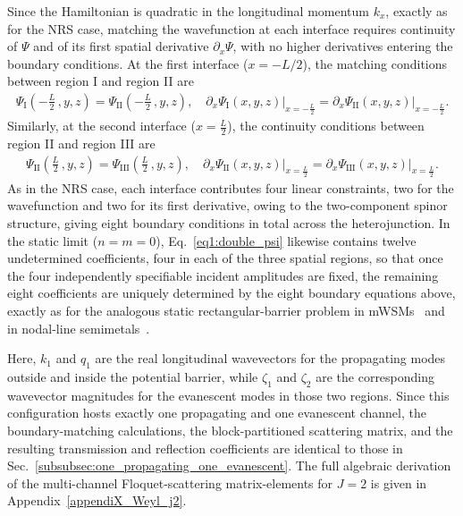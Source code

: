 \documentclass[aps,prb,onecolumn,longbibliography,nofootinbib,citeautoscript,10pt]{revtex4-2}
\begin{document}
Since the Hamiltonian is quadratic in the longitudinal momentum $k_x$, exactly as for the NRS case, matching the wavefunction at each interface requires continuity of $\Psi$ and of its first spatial derivative $\partial_x \Psi$, with no higher derivatives entering the boundary conditions. At the first interface ($x = -L/2$), the matching conditions between region I and region II are
\begin{align}
\label{eq:boundary_j2_x1_psi}
\Psi_{\text{I}} (-\frac{L} {2} \,,  y, z ) = \Psi_{\text{II}} (-\frac{L} {2} \,,  y, z ), \quad
 \partial_x \Psi_{\text{I}}(x, y, z)  \big |_{x=-\frac{L} {2}} 
=  \partial_x \Psi_{\text{II}}(x, y, z)  \big |_{x=-\frac{L} {2}}.
\end{align}
Similarly, at the second interface ($x = \frac{L} {2}$), the continuity conditions between region II and region III are
\begin{align}
	\label{eq:boundary_j2_x2_psi}
	\Psi_{\text{II}}\left(\frac{L} {2} \,,  y, z\right) = \Psi_{\text{III}}\left(\frac{L} {2} \,,  y, z\right), \quad
	\partial_x \Psi_{\text{II}}(x, y, z)  \big |_{x=\frac{L} {2}} 
	=  \partial_x \Psi_{\text{III}}(x, y, z)  \big |_{x=\frac{L} {2}}.
\end{align}
As in the NRS case, each interface contributes four linear constraints, two for the wavefunction and two for its first derivative, owing to the two-component spinor structure, giving eight boundary conditions in total across the heterojunction. In the static limit ($n=m=0$), Eq.~\eqref{eq1:double_psi} likewise contains twelve undetermined coefficients, four in each of the three spatial regions, so that once the four independently specifiable incident amplitudes are fixed, the remaining eight coefficients are uniquely determined by the eight boundary equations above, exactly as for the analogous static rectangular-barrier problem in mWSMs~\cite{Deng2020,ips-aritra} and in nodal-line semimetals~\cite{Khokhlov2018}.

Here, $k_1$ and $q_1$ are the real longitudinal wavevectors for the propagating modes outside and inside the potential barrier, while $\zeta_1$ and $\zeta_2$ are the corresponding wavevector magnitudes for the evanescent modes in those two regions. Since this configuration hosts exactly one propagating and one evanescent channel, the boundary-matching calculations, the block-partitioned scattering matrix, and the resulting transmission and reflection coefficients are identical to those in Sec.~\ref{subsubsec:one_propagating_one_evanescent}. The full algebraic derivation of the multi-channel Floquet-scattering matrix-elements for $J=2$ is given in Appendix~\ref{appendiX_Weyl_j2}.
\end{document}
